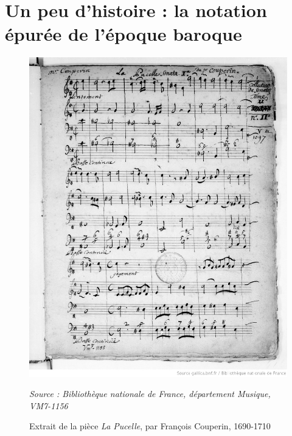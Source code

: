 \section{Un peu d'histoire : la notation épurée de l'époque baroque}
\label{sec:exempleMusiqueBaroque}
\begin{figure}[!htbp]
	\centering
	\includegraphics[keepaspectratio=true, width=\textwidth]{Annexes/i/exempleMusiqueBaroque.jpeg}
	\caption{Extrait de la pièce \textit{La Pucelle}, par François Couperin, 1690-1710}
	\medskip
	\small
	\textit{Source : Bibliothèque nationale de France, département Musique, VM7-1156} 	
	\label{fig:exempleMusiqueBaroque}
\end{figure}
\clearpage

